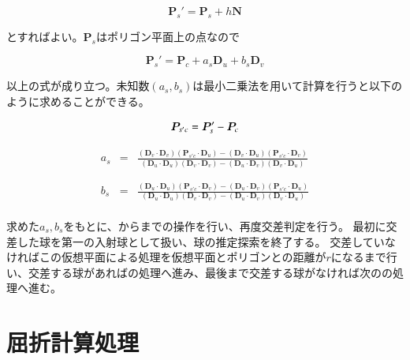 \begin{equation}
\bm{P}_s' = \bm{P}_s + h\bm{N}
\label{EPsdash}
\end{equation}

\noindent
とすればよい。$\bm{P}_s$はポリゴン平面上の点なので

\begin{equation}
\bm{P}_s' = \bm{P}_c + a_s\bm{D}_u + b_s\bm{D}_v 
\label{EPsdash2}
\end{equation}

\noindent
以上の式が成り立つ。未知数$(a_s, b_s)$は最小二乗法を用いて計算を行うと以下のように求めることができる。

\begin{equation}
\bm{P}_{s'c} = \bm{P}_s' - \bm{P}_c\\
\label{EPsdashc}
\end{equation}

\begin{eqnarray}
\label{Eas}
a_s &=& \frac{(\bm{D}_v \cdot \bm{D}_v)(\bm{P}_{s'c} \cdot \bm{D}_u) - (\bm{D}_v \cdot \bm{D}_u)(\bm{P}_{s'c} \cdot \bm{D}_v)}
{(\bm{D}_u \cdot \bm{D}_u)(\bm{D}_v \cdot \bm{D}_v) - (\bm{D}_u \cdot \bm{D}_v)(\bm{D}_v \cdot \bm{D}_u)}\\
\nonumber\\
\nonumber\\
\label{Ebs}
b_s &=& \frac{(\bm{D}_u \cdot \bm{D}_u)(\bm{P}_{s'c} \cdot \bm{D}_v) - (\bm{D}_u \cdot \bm{D}_v)(\bm{P}_{s'c} \cdot \bm{D}_u)}
{(\bm{D}_u \cdot \bm{D}_u)(\bm{D}_v \cdot \bm{D}_v) - (\bm{D}_u \cdot \bm{D}_v)(\bm{D}_v \cdot \bm{D}_u)}
\end{eqnarray}\\
\indent
求めた$a_s, b_s$をもとに、からまでの操作を行い、再度交差判定を行う。
最初に交差した球を第一の入射球として扱い、球の推定探索を終了する。
交差していなければこの仮想平面による処理を仮想平面とポリゴンとの距離が$r$になるまで行い、交差する球があればの処理へ進み、最後まで交差する球がなければ次のの処理へ進む。

\section{屈折計算処理}
\label{SRefraction}


